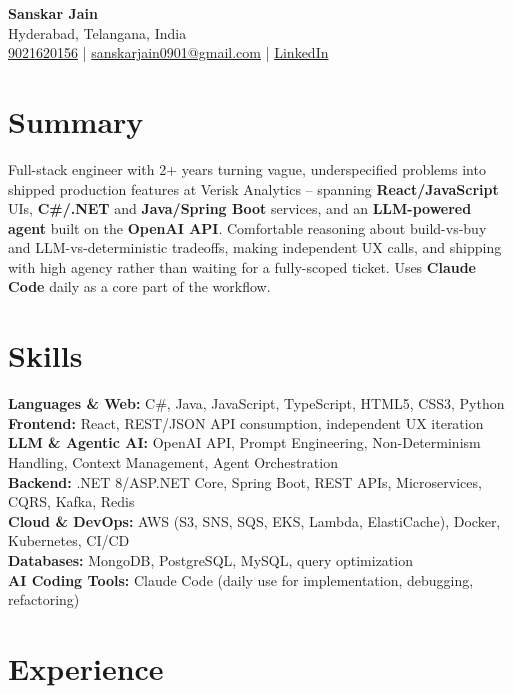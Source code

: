 \documentclass[a4paper,10pt]{article}
\begin{document}
\begin{center}
    {\LARGE \textbf{Sanskar Jain}} \\
    Hyderabad, Telangana, India \\
    \href{tel:9021620156}{9021620156} \;|\;
    \href{mailto:sanskarjain0901@gmail.com}{sanskarjain0901@gmail.com} \;|\;
    \href{https://www.linkedin.com/in/sanskar-jain0901/}{LinkedIn}
\end{center}

\vspace{3pt}

\section*{Summary}
Full-stack engineer with 2+ years turning vague, underspecified problems into shipped production features at Verisk Analytics -- spanning \textbf{React/JavaScript} UIs, \textbf{C\#/.NET} and \textbf{Java/Spring Boot} services, and an \textbf{LLM-powered agent} built on the \textbf{OpenAI API}.
Comfortable reasoning about build-vs-buy and LLM-vs-deterministic tradeoffs, making independent UX calls, and shipping with high agency rather than waiting for a fully-scoped ticket.
Uses \textbf{Claude Code} daily as a core part of the workflow.

\section*{Skills}
\textbf{Languages \& Web:} C\#, Java, JavaScript, TypeScript, HTML5, CSS3, Python \\
\textbf{Frontend:} React, REST/JSON API consumption, independent UX iteration \\
\textbf{LLM \& Agentic AI:} OpenAI API, Prompt Engineering, Non-Determinism Handling, Context Management, Agent Orchestration \\
\textbf{Backend:} .NET 8/ASP.NET Core, Spring Boot, REST APIs, Microservices, CQRS, Kafka, Redis \\
\textbf{Cloud \& DevOps:} AWS (S3, SNS, SQS, EKS, Lambda, ElastiCache), Docker, Kubernetes, CI/CD \\
\textbf{Databases:} MongoDB, PostgreSQL, MySQL, query optimization \\
\textbf{AI Coding Tools:} Claude Code (daily use for implementation, debugging, refactoring)

\section*{Experience}
\end{document}
